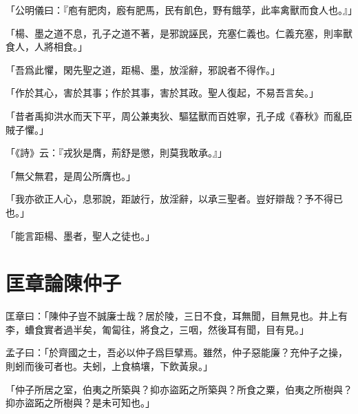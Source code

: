 「公明儀曰：『庖有肥肉，廏有肥馬，民有飢色，野有餓莩，此率禽獸而食人也。』」

「楊、墨之道不息，孔子之道不著，是邪說誣民，充塞仁義也。仁義充塞，則率獸食人，人將相食。」

「吾爲此懼，閑先聖之道，距楊、墨，放淫辭，邪說者不得作。」

「作於其心，害於其事；作於其事，害於其政。聖人復起，不易吾言矣。」

「昔者禹抑洪水而天下平，周公兼夷狄、驅猛獸而百姓寧，孔子成《春秋》而亂臣賊子懼。」

「《詩》云：『戎狄是膺，荊舒是懲，則莫我敢承。』」

「無父無君，是周公所膺也。」

「我亦欲正人心，息邪說，距詖行，放淫辭，以承三聖者。豈好辯哉？予不得已也。」

「能言距楊、墨者，聖人之徒也。」\par {}

\section{匡章論陳仲子}

匡章曰：「陳仲子豈不誠廉士哉？居於陵，三日不食，耳無聞，目無見也。井上有李，螬食實者過半矣，匍匐往，將食之，三咽，然後耳有聞，目有見。」

孟子曰：「於齊國之士，吾必以仲子爲巨擘焉。雖然，仲子惡能廉？充仲子之操，則蚓而後可者也。夫蚓，上食槁壤，下飲黃泉。」

「仲子所居之室，伯夷之所築與？抑亦盜跖之所築與？所食之粟，伯夷之所樹與？抑亦盜跖之所樹與？是未可知也。」

